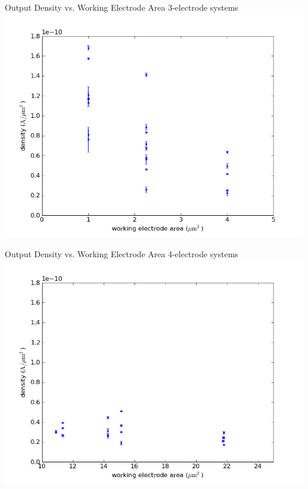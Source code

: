 \documentclass[10pt]{beamer}
\begin{document}
\begin{frame}{Output Density vs. Working Electrode Area}
	3-electrode systems
	\includegraphics[width=0.8\linewidth]{figures/area_low_v_density.png}
\end{frame}

\begin{frame}{Output Density vs. Working Electrode Area}
	4-electrode systems
	\includegraphics[width=0.8\linewidth]{figures/area_high_v_density.png}
\end{frame}
\end{document}
